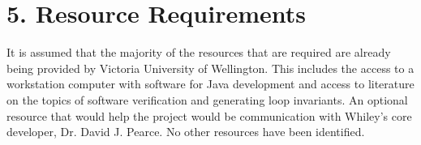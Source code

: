 \documentclass[11pt, a4paper, twoside, openright]{report}
\begin{document}

\section*{5. Resource Requirements}


It is assumed that the majority of the resources that are required are already being
provided by Victoria University of Wellington.
This includes the access to a workstation computer with software for Java development
and access to literature on the topics of software verification
and generating loop invariants.
An optional resource that would help the project would be communication
with Whiley's core developer, Dr. David J. Pearce.
No other resources have been identified.



\backmatter

%


\end{document}
